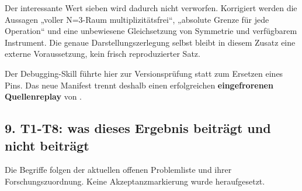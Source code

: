 Der interessante Wert sieben wird dadurch nicht verworfen. Korrigiert
werden die Aussagen „voller N=3-Raum multiplizitätsfrei``, „absolute
Grenze für jede Operation`` und eine unbewiesene Gleichsetzung von
Symmetrie und verfügbarem Instrument. Die genaue Darstellungszerlegung
selbst bleibt in diesem Zusatz eine externe Voraussetzung, kein frisch
reproduzierter Satz.

Der Debugging-Skill führte hier zur Versionsprüfung statt zum Ersetzen
eines Pins. Das neue Manifest trennt deshalb einen erfolgreichen
\textbf{eingefrorenen Quellenreplay} von
.

\subsection{9. T1-T8: was dieses Ergebnis beiträgt und nicht
beiträgt}\label{t1-t8-was-dieses-ergebnis-beitruxe4gt-und-nicht-beitruxe4gt}

Die Begriffe folgen der aktuellen offenen Problemliste und ihrer
Forschungszuordnung. Keine Akzeptanzmarkierung wurde heraufgesetzt.

